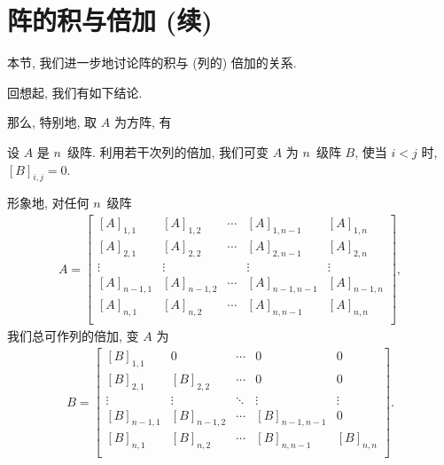 \section{阵的积与倍加 (续)}

本节, 我们进一步地讨论阵的积与 (列的) 倍加的关系.

回想起, 我们有如下结论.

\TheoremMultiplyAndAdd*

那么, 特别地, 取 \(A\) 为方阵, 有

\begin{theorem}
    设 \(A\) 是 \(n\)~级阵.
    利用若干次列的倍加,
    我们可变 \(A\) 为 \(n\)~级阵 \(B\),
    使当 \(i < j\) 时,
    \([B]_{i,j} = 0\).
\end{theorem}

形象地, 对任何 \(n\)~级阵
\begin{align*}
    A =
    \begin{bmatrix}
        [A]_{1,1}   & [A]_{1,2}   & \cdots & [A]_{1,n-1}   & [A]_{1,n}   \\
        [A]_{2,1}   & [A]_{2,2}   & \cdots & [A]_{2,n-1}   & [A]_{2,n}   \\
        \vdots      & \vdots      & {}     & \vdots        & \vdots      \\
        [A]_{n-1,1} & [A]_{n-1,2} & \cdots & [A]_{n-1,n-1} & [A]_{n-1,n} \\
        [A]_{n,1}   & [A]_{n,2}   & \cdots & [A]_{n,n-1}   & [A]_{n,n}   \\
    \end{bmatrix},
\end{align*}
我们总可作列的倍加, 变 \(A\) 为
\begin{align*}
    B =
    \begin{bmatrix}
        [B]_{1,1}   & 0           & \cdots & 0             & 0         \\
        [B]_{2,1}   & [B]_{2,2}   & \cdots & 0             & 0         \\
        \vdots      & \vdots      & \ddots & \vdots        & \vdots    \\
        [B]_{n-1,1} & [B]_{n-1,2} & \cdots & [B]_{n-1,n-1} & 0         \\
        [B]_{n,1}   & [B]_{n,2}   & \cdots & [B]_{n,n-1}   & [B]_{n,n} \\
    \end{bmatrix}.
\end{align*}

